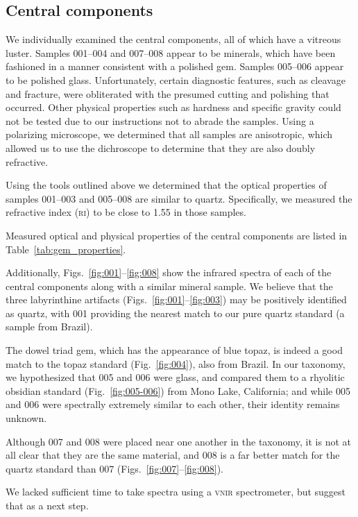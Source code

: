 \documentclass[10pt]{article}
\theoremstyle{definition}
\begin{document}
\subsection{Central components}
We individually examined the central components, all of which have a vitreous luster.
Samples 001--004 and 007--008 appear to be minerals, which have been fashioned in a manner consistent with a polished gem.
Samples 005--006 appear to be polished glass.
Unfortunately, certain diagnostic features, such as cleavage and fracture, were obliterated with the presumed cutting and polishing that occurred.
Other physical properties such as hardness and specific gravity could not be tested due to our instructions not to abrade the samples.
Using a polarizing microscope, we determined that all samples are anisotropic, which allowed us to use the dichroscope to determine that they are also doubly refractive.

Using the tools outlined above we determined that the optical properties of samples 001--003 and 005--008 are similar to quartz.
Specifically, we measured the refractive index (\textsc{ri}) to be close to 1.55 in those samples.  

Measured optical and physical properties of the central components are listed in Table~\ref{tab:gem_properties}.

Additionally, Figs.~\ref{fig:001}--\ref{fig:008} show the infrared spectra of each of the central components along with a similar mineral sample.
We believe that the three labyrinthine artifacts (Figs.~\ref{fig:001}--\ref{fig:003}) may be positively identified as quartz, with 001 providing the nearest match to our pure quartz standard (a sample from Brazil).

The dowel triad gem, which has the appearance of blue topaz, is indeed a good match to the topaz standard (Fig.~\ref{fig:004}), also from Brazil.
In our taxonomy, we hypothesized that 005 and 006 were glass, and compared them to a rhyolitic obsidian standard (Fig.~\ref{fig:005-006}) from Mono Lake, California; and while 005 and 006 were spectrally extremely similar to each other, their identity remains unknown.

Although 007 and 008 were placed near one another in the taxonomy, it is not at all clear that they are the same material, and 008 is a far better match for the quartz standard than 007 (Figs.~\ref{fig:007}--\ref{fig:008}).

We lacked sufficient time to take spectra using a \textsc{vnir} spectrometer, but suggest that as a next step.
\end{document}
